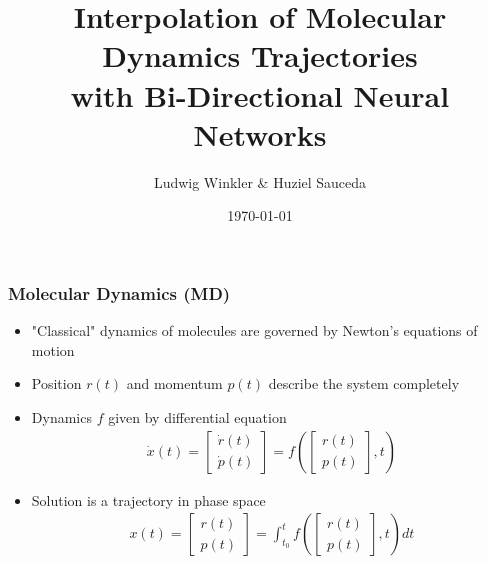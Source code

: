 \documentclass[usenames, dvipsnames, t]{beamer}
\title[Interpolation of MD with Bi-Directional NN]{Interpolation of Molecular Dynamics Trajectories \\ with Bi-Directional Neural Networks}
\subtitle{}
\author[Winkler \& Sauceda]{Ludwig Winkler \& Huziel Sauceda}
\date{\today}
\begin{document}
\def\mathn#1{\mathnormal{#1}}
\def\thet{\bm{\theta}}
\def\V{\mathn{V}}
\def\Q{\mathn{Q}}
\def\R{\mathn{R}}
\def\r{\mathn{r}}
\def\G{\mathn{G}}
\def\n{\mathn{n}}
\def\A{\mathn{A}}
\def\T{\mathn{T}}
\def\W{\mathn{W}}

\def\w{\mathn{w}}
\def\p{\mathn{p}}
\def\q{\mathn{q}}
\def\a{\mathn{a}}
\def\r{\mathn{r}}
\def\s{\mathn{s}}
\def\t{\mathn{t}}
\def\dist{1}

\newcommand{\E}{\mathbb{E}}



\begin{frame}
	\titlepage
\end{frame}


\begin{frame}
	\frametitle{Molecular Dynamics (MD)}
	\begin{itemize}
		\item<+-> "Classical" dynamics of molecules are governed by Newton's equations of motion 
		\item<+-> Position $r(t)$ and momentum $p(t)$ describe the system completely
		\item<+-> Dynamics $f$ given by differential equation
		\begin{align*}
			\dot{x}(t) =
			\begin{bmatrix}
				\dot{r}(t) \\ 
				\dot{p}(t)
			\end{bmatrix}
			= f \left(
			\begin{bmatrix}
				r(t) \\ 
				p(t)
			\end{bmatrix}
			,t
			\right)
		\end{align*}
		\onslide<+->
		\item Solution is a trajectory in phase space
		\begin{align*}
			x(t) = 
			\begin{bmatrix}
				r(t) \\ 
				p(t)
			\end{bmatrix}
			= 
			\int_{t_0}^t f \left( \begin{bmatrix} r(t) \\ p(t) \end{bmatrix} ,t \right) dt
		\end{align*}
	\end{itemize}
\end{frame}
\end{document}
